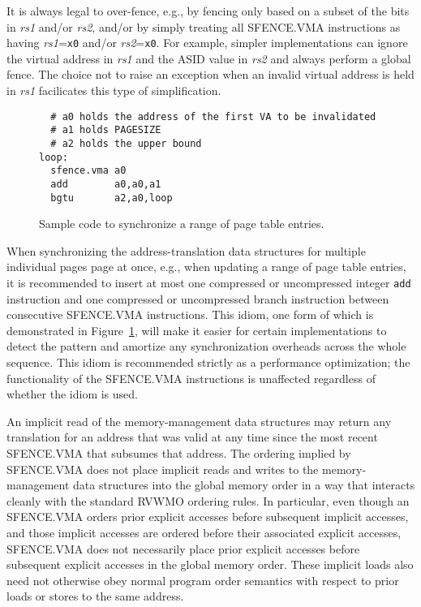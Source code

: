\begin{commentary}
It is always legal to over-fence, e.g., by fencing only based on a subset
of the bits in {\em rs1} and/or {\em rs2}, and/or by simply treating all
SFENCE.VMA instructions as having {\em rs1}={\tt x0} and/or
{\em rs2}={\tt x0}.  For example, simpler implementations can ignore the
virtual address in {\em rs1} and the ASID value in {\em rs2} and always perform
a global fence.  The choice not to raise an exception when an invalid virtual
address is held in {\em rs1} facilicates this type of simplification.
\end{commentary}

\begin{figure}[h!]
\begin{center}
\begin{verbatim}
  # a0 holds the address of the first VA to be invalidated
  # a1 holds PAGESIZE
  # a2 holds the upper bound
loop:
  sfence.vma a0
  add        a0,a0,a1
  bgtu       a2,a0,loop
\end{verbatim}
\end{center}
\caption{Sample code to synchronize a range of page table entries.}
\label{consecutive_sfences}
\end{figure}

\begin{commentary}
When synchronizing the address-translation data structures for multiple
individual pages page at once, e.g., when updating a range of page table
entries, it is recommended to insert at most one compressed or uncompressed
integer {\tt add} instruction and one compressed or uncompressed branch
instruction between consecutive SFENCE.VMA instructions.  This idiom, one form
of which is demonstrated in Figure~\ref{consecutive_sfences}, will make it
easier for certain implementations to detect the pattern and amortize any
synchronization overheads across the whole sequence.  This idiom is recommended
strictly as a performance optimization; the functionality of the SFENCE.VMA
instructions is unaffected regardless of whether the idiom is used.
\end{commentary}

An implicit read of the memory-management data structures may return any
translation for an address that was valid at
any time since the most recent SFENCE.VMA that subsumes that address.  The
ordering implied by SFENCE.VMA does not place implicit reads and writes to the
memory-management data structures into the global memory order in a way that
interacts cleanly with the standard RVWMO ordering rules.  In particular, even
though an SFENCE.VMA orders prior explicit accesses before subsequent implicit
accesses, and those implicit accesses are ordered before their associated
explicit accesses, SFENCE.VMA does not necessarily place prior explicit
accesses before subsequent explicit accesses in the global memory order.  These
implicit loads also need not otherwise obey normal program order semantics with
respect to prior loads or stores to the same address.

